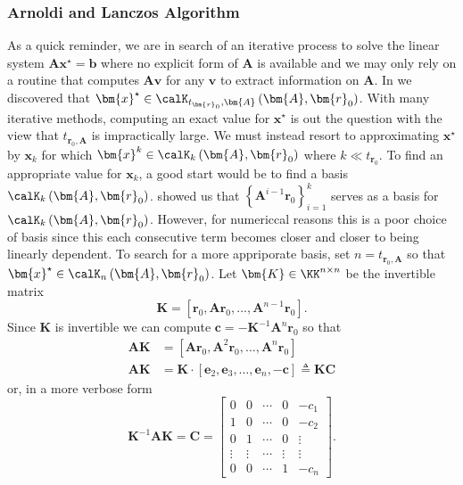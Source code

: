\subsubsection{Arnoldi and Lanczos Algorithm}\label{Section1.1.3}

As a quick reminder, we are in search of an iterative process to solve the linear system $\bm{A} \bm{x}^{\star} = \bm{b}$ where no explicit form of $\bm{A}$ is available and we may only rely on a routine that computes $\bm{A} \bm{v}$ for any $\bm{v}$ to extract information on $\bm{A}$. In  we discovered that $\bm{x}^{\star} \in \calK_{t_{\bm{r}_0}, \bm{A}} \left( \bm{A}, \bm{r}_0 \right)$. With many iterative methods, computing an exact value for $\bm{x}^{\star}$ is out the question with the view that $t_{\bm{r}_0, \bm{A}}$ is impractically large. We must instead resort to approximating $\bm{x}^{\star}$ by $\bm{x}_k$ for which $\bm{x}^{k} \in \calK_{k} \left( \bm{A}, \bm{r}_0 \right)$ where $k \ll t_{\bm{r}_0}$. To find an appropriate value for $\bm{x}_k$, a good start would be to find a basis $\calK_{k} \left( \bm{A}, \bm{r}_0 \right)$.  showed us that $\left\{ \bm{A}^{i-1} \bm{r}_0 \right\}_{i=1}^{k}$ serves as a basis for $\calK_{k} \left( \bm{A}, \bm{r}_0 \right)$. However, for numericcal reasons this is a poor choice of basis since this each consecutive term becomes closer and closer to being linearly dependent. To search for a more appriporate basis, set $n = t_{\bm{r}_0, \bm{A}}$ so that $\bm{x}^{\star} \in \calK_{n} \left( \bm{A}, \bm{r}_0 \right)$. Let $\bm{K} \in \KK^{n \times n}$ be the invertible matrix
\[
    \bm{K} = \left[ \bm{r}_0 , \bm{A} \bm{r}_0, \ldots , \bm{A}^{n-1} \bm{r}_0 \right].
\]
Since $\bm{K}$ is invertible we can compute $\bm{c} = - \bm{K}^{-1} \bm{A}^{n} \bm{r}_0$ so that
\begin{align*}
    \bm{A} \bm{K} & = \left[ \bm{A} \bm{r}_0, \bm{A}^{2} \bm{r}_0, \ldots , \bm{A}^{n} \bm{r}_0 \right]                     \\
    \bm{A} \bm{K} & = \bm{K} \cdot \left[ \bm{e}_2, \bm{e}_3, \ldots , \bm{e}_n, - \bm{c}  \right] \triangleq \bm{K} \bm{C}
\end{align*}
or, in a more verbose form
\[
    \bm{K}^{-1} \bm{A} \bm{K} = \bm{C} =
    \begin{bmatrix}
        0      & 0      & \cdots & 0      & -c_1   \\
        1      & 0      & \cdots & 0      & -c_2   \\
        0      & 1      & \cdots & 0      & \vdots \\
        \vdots & \vdots & \cdots & \vdots & \vdots \\
        0      & 0      & \cdots & 1      & -c_n
    \end{bmatrix}.
\]
